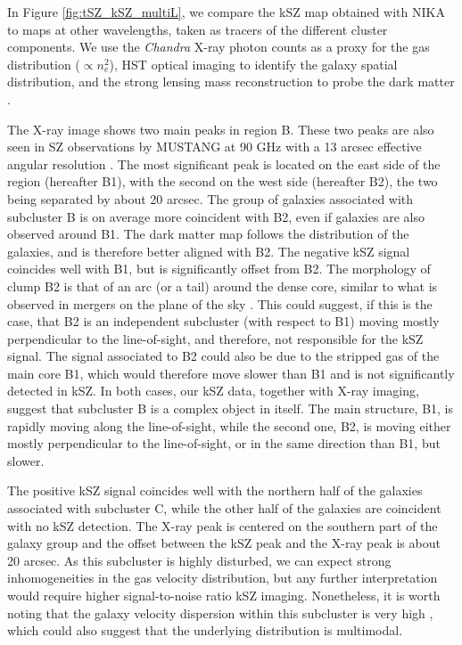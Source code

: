 \documentclass[twocolumn,traditabstract]{aa}
\begin{document}
In Figure  \ref{fig:tSZ_kSZ_multiL}, we compare the kSZ map obtained with NIKA to maps at other wavelengths, taken as tracers of the different cluster components. We use the \textit{Chandra} X-ray photon counts as a proxy for the gas distribution ($\propto n_e^2$), HST optical imaging \citep[CLASH data,][]{Postman2012} to identify the galaxy spatial distribution, and the strong lensing mass reconstruction to probe the dark matter \citep{Zitrin2011}. 

The X-ray image shows two main peaks in region B. These two peaks are also seen in SZ observations by MUSTANG at 90 GHz with a 13 arcsec effective angular resolution \citep{Mroczkowski2012}. The most significant peak is located on the east side of the region (hereafter B1), with the second on the west side (hereafter B2), the two being separated by about 20 arcsec. The group of galaxies associated with subcluster B is on average more coincident with B2, even if galaxies are also observed around B1. The dark matter map follows the distribution of the galaxies, and is therefore better aligned with B2. The negative kSZ signal coincides well with B1, but is significantly offset from B2. The morphology of clump B2 is that of an arc (or a tail) around the dense core, similar to what is observed in mergers on the plane of the sky \citep[e.g.,][for the bullet cluster]{Clowe2006}. This could suggest, if this is the case, that B2 is an independent subcluster (with respect to B1) moving mostly perpendicular to the line-of-sight, and therefore, not responsible for the kSZ signal. The signal associated to B2 could also be due to the stripped gas of the main core B1, which would therefore move slower than B1 and is not significantly detected in kSZ. In both cases, our kSZ data, together with X-ray imaging, suggest that subcluster B is a complex object in itself. The main structure, B1, is rapidly moving along the line-of-sight, while the second one, B2, is moving either mostly perpendicular to the line-of-sight, or in the same direction than B1, but slower.

The positive kSZ signal coincides well with the northern half of the galaxies associated with subcluster C, while the other half of the galaxies are coincident with no kSZ detection. The X-ray peak is centered on the southern part of the galaxy group and the offset between the kSZ peak and the X-ray peak is about 20 arcsec. As this subcluster is highly disturbed, we can expect strong inhomogeneities in the gas velocity distribution, but any further interpretation would require higher signal-to-noise ratio kSZ imaging. Nonetheless, it is worth noting that the galaxy velocity dispersion within this subcluster is very high \citep[$1761^{+234}_{-607}$ km/s for 10 redshifts, see][]{Ma2009}, which could also suggest that the underlying distribution is multimodal.
\end{document}
